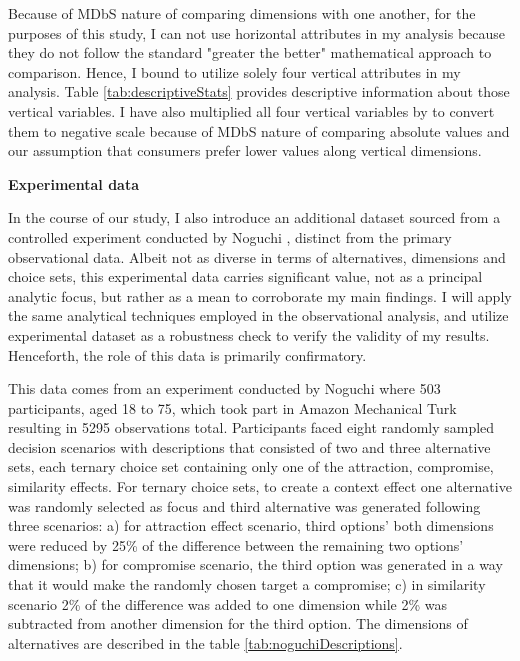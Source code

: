 \documentclass[a4paper,12pt]{article}
\newcommand{\citeyearonly}[1]{\citeyearpar{#1}}
\begin{document}
Because of MDbS nature of comparing dimensions with one another, for the purposes of this study, I can not use horizontal attributes in my analysis because they do not follow the standard "greater the better" mathematical approach to comparison. Hence, I bound to utilize solely four vertical attributes in my analysis. Table \ref{tab:descriptiveStats} provides descriptive information about those vertical variables. I have also multiplied all four vertical variables by  to convert them to negative scale because of MDbS nature of comparing absolute values and our assumption that consumers prefer lower values along vertical dimensions.

\textbf{Experimental data}

In the course of our study, I also introduce an additional dataset sourced from a controlled experiment conducted by Noguchi \citeyearonly{noguchi2018multialternative}, distinct from the primary observational data. Albeit not as diverse in terms of alternatives, dimensions and choice sets, this experimental data carries significant value, not as a principal analytic focus, but rather as a mean to corroborate my main findings. I will apply the same analytical techniques employed in the observational analysis, and utilize experimental dataset as a robustness check to verify the validity of my results. Henceforth, the role of this data is primarily confirmatory.

This data comes from an experiment conducted by Noguchi \citeyearonly{noguchi2018multialternative} where 503 participants, aged 18 to 75, which took part in Amazon Mechanical Turk resulting in 5295 observations total. Participants faced eight randomly sampled decision scenarios with descriptions that consisted of two and three alternative sets, each ternary choice set containing only one of the attraction, compromise, similarity effects. For ternary choice sets, to create a context effect one alternative was randomly selected as focus and third alternative was generated following three scenarios: a) for attraction effect scenario, third options' both dimensions were reduced by 25\% of the difference between the remaining two options' dimensions; b) for compromise scenario, the third option was generated in a way that it would make the randomly chosen target a compromise; c) in similarity scenario 2\% of the difference was added to one dimension while 2\% was subtracted from another dimension for the third option. The dimensions of alternatives are described in the table \ref{tab:noguchiDescriptions}.
\end{document}
